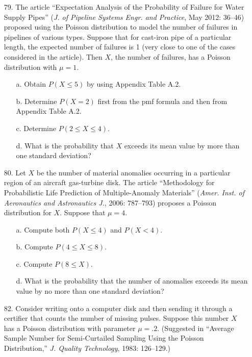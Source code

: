 \documentclass[letterpaper,12pt]{article}
\begin{document}
\maketitle

\begin{enumerate}
  \item[79.]
    The article ``Expectation Analysis of the Probability of Failure for Water Supply Pipes'' (\textit{J. of Pipeline Systems Engr. and Practice}, May 2012: 36–46) proposed using the Poisson distribution to model the number of failures in pipelines of various types. Suppose that for cast-iron pipe of a particular length, the expected number of failures is 1 (very close to one of the cases considered in the article). Then $X$, the number of failures, has a Poisson distribution with $\mu = 1$.
    \begin{enumerate}
      \item[a.]
        Obtain $P(X \le 5)$ by using Appendix Table A.2.
      \item[b.]
        Determine $P(X = 2)$ first from the pmf formula and then from Appendix Table A.2.
      \item[c.]
        Determine $P(2 \le X \le 4)$.
      \item[d.]
        What is the probability that $X$ exceeds its mean value by more than one standard deviation?
    \end{enumerate}
  \item[80.]
    Let $X$ be the number of material anomalies occurring in a particular region of an aircraft gas-turbine disk. The article ``Methodology for Probabilistic Life Prediction of Multiple-Anomaly Materials'' (\textit{Amer. Inst. of Aeronautics and Astronautics J.}, 2006: 787–793) proposes a Poisson distribution for $X$. Suppose that $\mu = 4$.
    \begin{enumerate}
      \item[a.]
        Compute both $P(X \le 4)$ and $P(X < 4)$.
      \item[b.]
        Compute $P(4 \le X \le 8)$.
      \item[c.]
        Compute $P(8 \le X)$.
      \item[d.]
        What is the probability that the number of anomalies exceeds its mean value by no more than one standard deviation?
    \end{enumerate}
  \item[82.]
    Consider writing onto a computer disk and then sending it through a certifier that counts the number of missing pulses. Suppose this number $X$ has a Poisson distribution with parameter $\mu = .2$. (Suggested in ``Average Sample Number for Semi-Curtailed Sampling Using the Poisson Distribution,'' \textit{J. Quality Technology}, 1983: 126–129.)

\end{enumerate}
\end{document}

